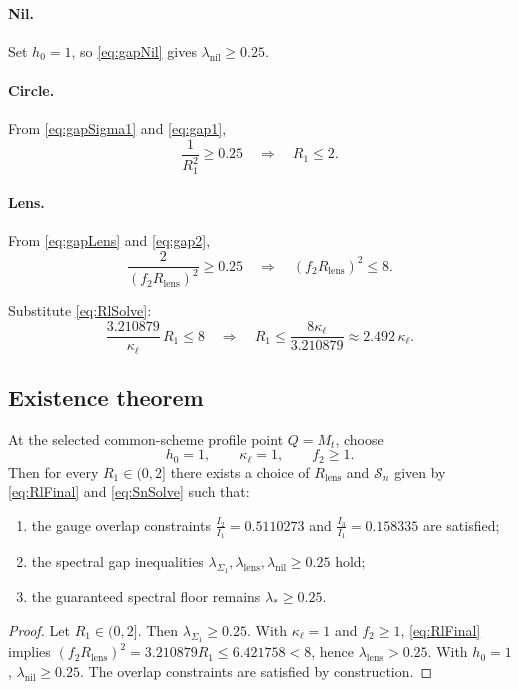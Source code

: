 \documentclass[11pt]{article}
\begin{document}
\paragraph{Nil.}
Set $h_0=1$, so \eqref{eq:gapNil} gives $\lambda_{\mathrm{nil}}\ge0.25$.

\paragraph{Circle.}
From \eqref{eq:gapSigma1} and \eqref{eq:gap1},
\[
\frac{1}{R_1^2}\ge 0.25
\quad\Rightarrow\quad
R_1\le 2.
\]

\paragraph{Lens.}
From \eqref{eq:gapLens} and \eqref{eq:gap2},
\[
\frac{2}{(f_2R_{\mathrm{lens}})^2}\ge 0.25
\quad\Rightarrow\quad
(f_2R_{\mathrm{lens}})^2\le 8.
\]

Substitute \eqref{eq:RlSolve}:
\[
\frac{3.210879}{\kappa_\ell}\,R_1 \le 8
\quad\Rightarrow\quad
R_1 \le \frac{8\kappa_\ell}{3.210879}\approx 2.492\,\kappa_\ell.
\]

\subsection{Existence theorem}

\begin{theorem}
At the selected common-scheme profile point $Q=M_t$, choose
\[
h_0=1,\qquad \kappa_\ell=1,\qquad f_2\ge 1.
\]
Then for every $R_1\in(0,2]$ there exists a choice of
$R_{\mathrm{lens}}$ and $\mathcal{S}_n$ given by
\eqref{eq:RlFinal} and \eqref{eq:SnSolve} such that:
\begin{enumerate}
\item the gauge overlap constraints
$\frac{I_2}{I_1}=0.5110273$ and $\frac{I_3}{I_1}=0.158335$
are satisfied;
\item the spectral gap inequalities
$\lambda_{\Sigma_1},\lambda_{\mathrm{lens}},\lambda_{\mathrm{nil}}\ge 0.25$
hold;
\item the guaranteed spectral floor remains $\lambda_{\ast}\ge0.25$.
\end{enumerate}
\end{theorem}

\begin{proof}
Let $R_1\in(0,2]$. Then $\lambda_{\Sigma_1}\ge 0.25$.
With $\kappa_\ell=1$ and $f_2\ge 1$, \eqref{eq:RlFinal} implies
$(f_2R_{\mathrm{lens}})^2=3.210879R_1\le 6.421758<8$, hence
$\lambda_{\mathrm{lens}}>0.25$.
With $h_0=1$, $\lambda_{\mathrm{nil}}\ge0.25$.
The overlap constraints are satisfied by construction.
\end{proof}
\end{document}
